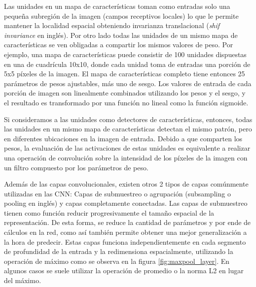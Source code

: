 \documentclass[a4paper,11pt,spanish]{book}
\begin{document}
      Las unidades en un mapa de características toman como entradas solo una pequeña subregión de la imagen (campos receptivos locales) lo que le permite mantener
      la localidad espacial obteniendo invarianza translacional (\emph{shif invariance} en inglés). 
      Por otro lado todas las unidades de un mismo mapa de características se ven obligadas a compartir los mismos valores de peso.
      Por ejemplo, una mapa de características puede consistir de 100 unidades dispuestas en una de cuadrícula 10x10,
      donde cada unidad  toma de entradas una porción de 5x5 píxeles de la imagen.
      El mapa de características completo tiene entonces 25 parámetros de pesos ajustables, más uno de sesgo. 
      Los valores de entrada de cada porción de imagen son linealmente combinados utilizando los pesos y el sesgo, y el resultado es transformado por una función 
      no lineal como la función sigmoide.

      Si consideramos a las unidades como detectores de características, entonces, todas las unidades en un mismo mapa de características detectan el mismo patrón,
      pero en diferentes ubicaciones en la imagen de entrada. 
      Debido a que comparten los pesos, la evaluación de las activaciones de estas unidades es equivalente a  realizar una operación de convolución
      sobre la intensidad de los píxeles de la imagen con un filtro compuesto por los parámetros de peso.

      Además de las capas convolucionales, existen otros 2 tipos de capas comúnmente utilizadas en las CNN: Capas de submuestreo o agrupación (subsampling o pooling en inglés) y
      capas completamente conectadas. Las capas de submuestreo tienen como función reducir progresivamente el tamaño espacial de la representación.
      De esta forma, se reduce la cantidad de parámetros y por ende de cálculos en la red, como así también permite obtener una mejor generalización a la hora de predecir. 
      Estas capas funciona independientemente en cada segmento de profundidad de la entrada y la redimensiona espacialmente, utilizando la operación de máximo como se observa en
      la figura \ref{fig:maxpool_layer}. En algunos casos se suele utilizar la operación de promedio o la norma L2 en lugar del máximo.
\end{document}
